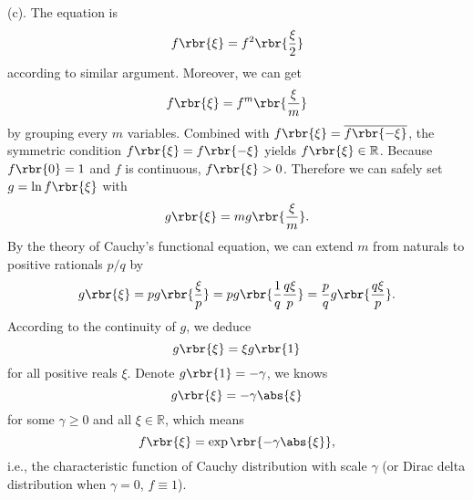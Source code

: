 \documentclass[english, nochinese]{pnote}
\begin{document}
(c). The equation is
\begin{equation}
f \rbr{\xi} = f^2 \rbr{\frac{\xi}{2}}
\end{equation}
according to similar argument. Moreover, we can get
\begin{equation}
f \rbr{\xi} = f^m \rbr{\frac{\xi}{m}}
\end{equation}
by grouping every $m$ variables. Combined with $ f \rbr{\xi} = \overline{ f \rbr{-\xi} } $, the symmetric condition $ f \rbr{\xi} = f \rbr{-\xi} $ yields $ f \rbr{\xi} \in \mathbb{R} $. Because $ f \rbr{0} = 1 $ and $f$ is continuous, $ f \rbr{\xi} > 0 $. Therefore we can safely set $ g = \ln f \rbr{\xi} $ with
\begin{equation}
g \rbr{\xi} = m g \rbr{\frac{\xi}{m}}.
\end{equation}
By the theory of Cauchy's functional equation, we can extend $m$ from naturals to positive rationals $ p / q $ by
\begin{equation}
g \rbr{\xi} = p g \rbr{\frac{\xi}{p}} = p g \rbr{ \frac{1}{q} \frac{ q \xi}{p} } =  \frac{p}{q} g \rbr{\frac{ q \xi }{p}}.
\end{equation}
According to the continuity of $g$, we deduce
\begin{equation}
g \rbr{\xi} = \xi g \rbr{1}
\end{equation}
for all positive reals $\xi$. Denote $ g \rbr{1} = -\gamma $, we knows
\begin{equation}
g \rbr{\xi} = -\gamma \abs{\xi}
\end{equation}
for some $ \gamma \ge 0 $ and all $ \xi \in \mathbb{R} $, which means
\begin{equation}
f \rbr{\xi} = \exp \rbr{ -\gamma \abs{\xi} },
\end{equation}
i.e., the characteristic function of Cauchy distribution with scale $\gamma$ (or Dirac delta distribution when $ \gamma = 0 $, $ f \equiv 1 $).
\end{document}
